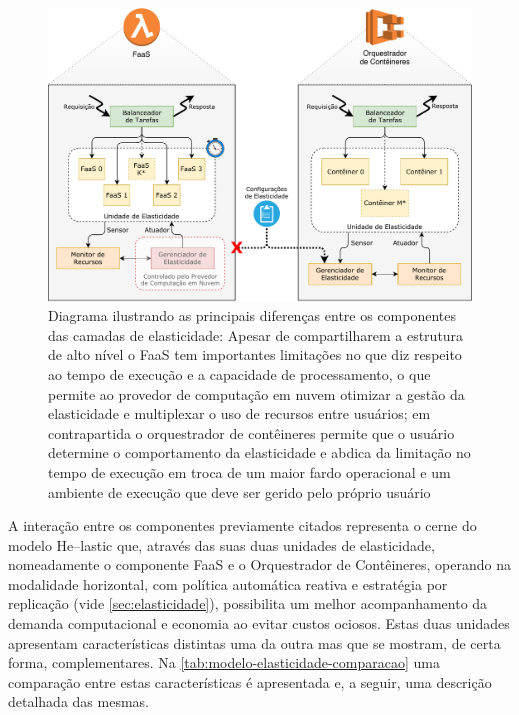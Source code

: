 \documentclass[english,brazilian]{UNISINOSmonografia} %
\newcommand\defaultFigureWidth{0.9}
\begin{document}
\begin{figure}[tb]
\centering%
\begin{minipage}{\defaultFigureWidth\textwidth}
	\caption{Diagrama ilustrando as principais diferenças entre os componentes das camadas de elasticidade: Apesar de compartilharem a estrutura de alto nível o FaaS tem importantes limitações no que diz respeito ao tempo de execução e a capacidade de processamento, o que permite ao provedor de computação em nuvem otimizar a gestão da elasticidade e multiplexar o uso de recursos entre usuários; em contrapartida o orquestrador de contêineres permite que o usuário determine o comportamento da elasticidade e abdica da limitação no tempo de execução em troca de um maior fardo operacional e um ambiente de execução que deve ser gerido pelo próprio usuário}
	\label{fig:modelo-componentes-explodidos}
	\includegraphics[width=\textwidth]{modelo-componentes-explodidos}
\end{minipage}
\end{figure}







A interação entre os componentes previamente citados representa o cerne do modelo \textsf{He}--lastic que, através das suas duas unidades de elasticidade, nomeadamente o componente FaaS e o Orquestrador de Contêineres, operando na modalidade horizontal, com política automática reativa e estratégia por replicação (vide \autoref{sec:elasticidade}), possibilita um melhor acompanhamento da demanda computacional e economia ao evitar custos ociosos.
Estas duas unidades apresentam características distintas uma da outra mas que se mostram, de certa forma, complementares.
Na \autoref{tab:modelo-elasticidade-comparacao} uma comparação entre estas características é apresentada e, a seguir, uma descrição detalhada das mesmas.
\end{document}
